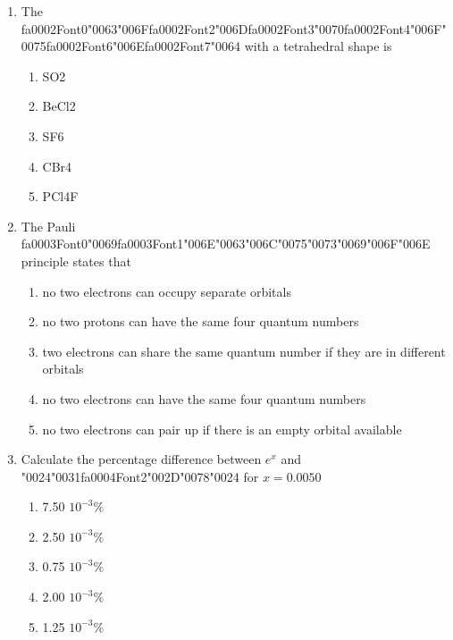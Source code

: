 \documentclass[12pt]{article}
\begin{document}
\begin{enumerate}[label=\arabic*.]
\begin{enumerate}[label=(\alph*)]
\end{enumerate}
\item The {\csname fa0002Font0\endcsname\char"0063}{\char"006F}{\csname fa0002Font2\endcsname\char"006D}{\csname fa0002Font3\endcsname\char"0070}{\csname fa0002Font4\endcsname\char"006F}{\char"0075}{\csname fa0002Font6\endcsname\char"006E}{\csname fa0002Font7\endcsname\char"0064} with a tetrahedral shape is
\begin{enumerate}[label=(\alph*)]
    \item SO2
    \item BeCl2
    \item SF6
    \item CBr4
    \item PCl4F
\end{enumerate}
\item The Pauli {\csname fa0003Font0\endcsname\char"0069}{\csname fa0003Font1\endcsname\char"006E}{\char"0063}{\char"006C}{\char"0075}{\char"0073}{\char"0069}{\char"006F}{\char"006E} principle states that
\begin{enumerate}[label=(\alph*)]
    \item no two electrons can occupy separate orbitals
    \item no two protons can have the same four quantum numbers
    \item two electrons can share the same quantum number if they are in different orbitals
    \item no two electrons can have the same four quantum numbers
    \item no two electrons can pair up if there is an empty orbital available
\end{enumerate}
\item Calculate the percentage difference between $e^x$ and {\char"0024}{\char"0031}{\csname fa0004Font2\endcsname\char"002D}{\char"0078}{\char"0024} for $x=0.0050$
\begin{enumerate}[label=(\alph*)]
    \item 7.50 $10^{-3} \%$
    \item 2.50 $10^{-3} \%$
    \item 0.75 $10^{-3} \%$
    \item 2.00 $10^{-3} \%$
    \item 1.25 $10^{-3} \%$
\end{enumerate}
\end{enumerate}
\end{document}
